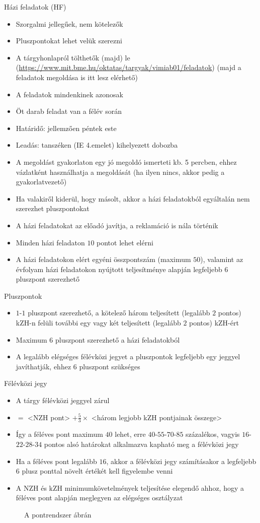 \documentclass[a4paper,12pt]{article}
\begin{document}
	Házi feladatok (HF)
	\begin{itemize}
		\item Szorgalmi jellegűek, nem kötelezők
		\item Pluszpontokat lehet velük szerezni
		\item A tárgyhonlapról tölthetők (majd) le (\url{https://www.mit.bme.hu/oktatas/targyak/vimiab01/feladatok}) (majd a feladatok megoldása is itt lesz elérhető)
		\item A feladatok mindenkinek azonosak
		\item Öt darab feladat van a félév során
		\item Határidő: jellemzően péntek este
		\item Leadás: tanszéken (IE 4.emelet) kihelyezett dobozba
		\item A megoldást gyakorlaton egy jó megoldó ismerteti kb. 5 percben, ehhez vázlatként használhatja a megoldását (ha ilyen nincs, akkor pedig a gyakorlatvezető)
		\item Ha valakiről kiderül, hogy másolt, akkor a házi feladatokból egyáltalán nem szerezhet pluszpontokat
		\item A házi feladatokat az előadó javítja, a reklamáció is nála történik
		\item Minden házi feladaton $10$ pontot lehet elérni
		\item A házi feladatokon elért egyéni összpontszám (maximum $50$), valamint az évfolyam házi feladatokon nyújtott teljesítménye alapján legfeljebb $6$ pluszpont szerezhető
	\end{itemize}
	Pluszpontok
	\begin{itemize}
		\item $1$-$1$ pluszpont szerezhető, a kötelező három teljesített (legalább $2$ pontos) kZH-n felüli további egy vagy két teljesített (legalább $2$ pontos) kZH-ért
		\item Maximum $6$ pluszpont szerezhető a házi feladatokból
		\item A legalább elégséges félévközi jegyet a pluszpontok legfeljebb egy jeggyel javíthatják, ehhez $6$ pluszpont szükséges
	\end{itemize}
	Félévközi jegy
	\begin{itemize}
		\item A tárgy félévközi jeggyel zárul
		\item <Féléves pont> $=$ <NZH pont> $+\frac{5}{3}\times$ <három legjobb kZH pontjainak összege>
		\item Így a féléves pont maximum $40$ lehet, erre $40$-$55$-$70$-$85$ százalékos, vagyis $16$-$22$-$28$-$34$ pontos alsó határokat alkalmazva kapható meg a félévközi jegy
		\item Ha a féléves pont legalább $16$, akkor a félévközi jegy számításakor a legfeljebb $6$ plusz ponttal növelt értékét kell figyelembe venni
		\item A NZH és kZH minimumkövetelmények teljesítése elegendő ahhoz, hogy a féléves pont alapján meglegyen az elégséges osztályzat
	\end{itemize}
	\begin{landscape}
		\begin{figure}[h]
			
			\caption{A pontrendszer ábrán}
		\end{figure}
	\end{landscape}
\end{document}
